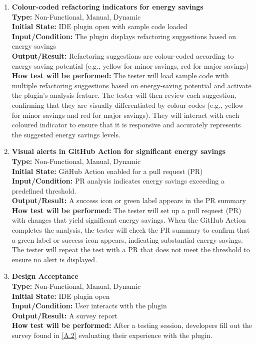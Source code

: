 \documentclass[12pt, titlepage]{article}
\begin{document}
\begin{enumerate}[label={\bf \textcolor{Maroon}{test-LF-\arabic*}}, wide=0pt, font=\itshape]
  \item \textbf{Colour-coded refactoring indicators for energy savings} \\[2mm]
    \textbf{Type:} Non-Functional, Manual, Dynamic \\
    \textbf{Initial State:} IDE plugin open with sample code loaded \\
    \textbf{Input/Condition:} The plugin displays refactoring suggestions based on energy savings \\
    \textbf{Output/Result:} Refactoring suggestions are colour-coded according to energy-saving potential (e.g., yellow for minor savings, red for major savings) \\[2mm]
    \textbf{How test will be performed:} The tester will load sample code with multiple refactoring suggestions based on energy-saving potential and activate the plugin’s analysis feature. The tester will then review each suggestion, confirming that they are visually differentiated by colour codes (e.g., yellow for minor savings and red for major savings). They will interact with each coloured indicator to ensure that it is responsive and accurately represents the suggested energy savings levels.

  \item \textbf{Visual alerts in GitHub Action for significant energy savings} \\[2mm]
    \textbf{Type:} Non-Functional, Manual, Dynamic \\
    \textbf{Initial State:} GitHub Action enabled for a pull request (PR) \\
    \textbf{Input/Condition:} PR analysis indicates energy savings exceeding a predefined threshold. \\
    \textbf{Output/Result:} A success icon or green label appears in the PR summary \\[2mm]
    \textbf{How test will be performed:} The tester will set up a pull request (PR) with changes that yield significant energy savings. When the GitHub Action completes the analysis, the tester will check the PR summary to confirm that a green label or success icon appears, indicating substantial energy savings. The tester will repeat the test with a PR that does not meet the threshold to ensure no alert is displayed. 

  \item \textbf{Design Acceptance} \\[2mm]
    \textbf{Type:} Non-Functional, Manual, Dynamic \\
    \textbf{Initial State:} IDE plugin open \\
    \textbf{Input/Condition:} User interacts with the plugin \\
    \textbf{Output/Result:} A survey report \\[2mm]
    \textbf{How test will be performed:} After a testing session, developers fill out the survey found in \ref{A.2} evaluating their experience with the plugin.
\end{enumerate}
\end{document}
